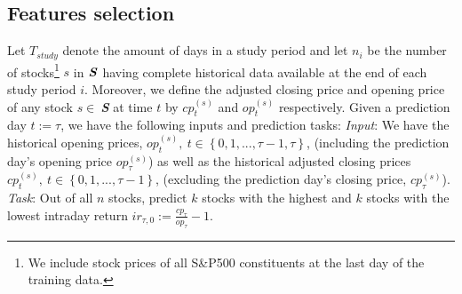 \documentclass[review]{elsarticle}
\begin{document}
\subsection{Features selection}
\label{subsec:features}
Let $T_{study}$ denote the amount of days in a study period
and let $n_i$ be the number of stocks\footnote{We include stock prices of all S\&P500 constituents at the last day of the training data.} $s$ in $\textbf{\textit{S}}$ having complete historical data available at the end of each study period $i$. Moreover, we define the adjusted closing price and opening price of any stock $s \in \ $\textbf{\textit{S}} at time $t$  by 
$cp^{(s)}_{t}$
and
$op^{(s)}_{t}$ respectively.
\newline
Given a prediction day $t := \tau$, we have the following inputs and prediction tasks: \newline
\textit{Input}: We have the historical opening prices,  $op_t^{(s)},\ t\in \left \{ 0,1,...,\tau-1,\tau \right \}$, (including the prediction day's opening price $op_\tau^{(s)}$) 
as well as
the historical adjusted closing prices $cp_t^{(s)},\ t\in \left \{ 0,1,...,\tau-1 \right \}$, (excluding the prediction day's closing price, $cp_\tau^{(s)}$).
\\
\textit{Task}: Out of all $n$ stocks, predict $k$ stocks with the highest and $k$ stocks with the lowest intraday return $ir_{\tau,0} := \frac{cp_{\tau}}{op_{\tau}}-1$.


\newpage
\end{document}
